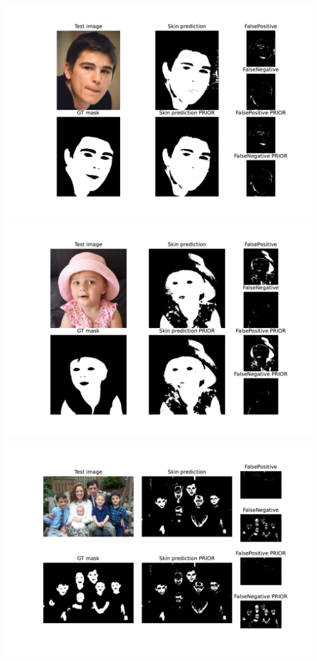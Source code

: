 \documentclass[11pt]{article}
\begin{document}
\begin{enumerate}[1.]
	\includegraphics[width=6in]{Training-MVND.pdf}\\
	\includegraphics[width=6in]{Test-portrait-MVND.pdf}\\
	\includegraphics[width=6in]{Test-family-MVND.pdf}


\end{enumerate}
\end{document}
